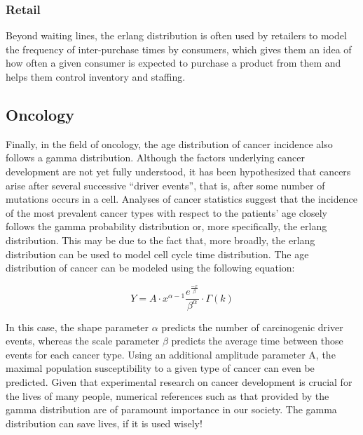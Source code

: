 \documentclass[12pt]{article}
\begin{document}
\subsubsection{Retail}
Beyond waiting lines, the erlang distribution is often used by retailers to model the frequency of inter-purchase times
by consumers, which gives them an idea of how often a given consumer is expected to purchase a product from them and
helps them control inventory and staffing.

\subsection{Oncology}
Finally, in the field of oncology, the age distribution of cancer incidence also follows a gamma distribution. Although
the factors underlying cancer development are not yet fully understood, it has been hypothesized that cancers arise
after several successive “driver events”, that is, after some number of mutations occurs in a cell. Analyses of cancer
statistics suggest that the incidence of the most prevalent cancer types with respect to the patients' age closely
follows the gamma probability distribution or, more specifically, the erlang distribution. This may be due to the fact
that, more broadly, the erlang distribution can be used to model cell cycle time
distribution\cite{belikovNumberKeyCarcinogenic2017}. The age distribution of cancer can be modeled using the following equation:

\begin{equation}
	Y = A\cdot x^{\alpha-1}\frac{e^{\frac{-x}{\beta}}}{\beta^\alpha}\cdot\Gamma(k)
\end{equation}

In this case, the shape parameter $\alpha$ predicts the number of carcinogenic driver events, whereas the scale
parameter $\beta$ predicts the average time between those events for each cancer type. Using an additional amplitude
parameter A, the maximal population susceptibility to a given type of cancer can even be
predicted\cite{belikovNumberKeyCarcinogenic2017}. Given that experimental research on cancer development is crucial for
the lives of many people, numerical references such as that provided by the gamma distribution are of paramount
importance in our society. The gamma distribution can save lives, if it is used wisely!

\end{document}
